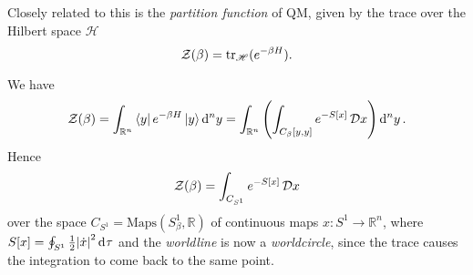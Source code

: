 \begin{definition}
  Closely related to this is the \emph{partition function} of QM, given by the trace over the Hilbert space $\mathscr{H}$
  \begin{equation}
    \mathcal{Z}(\beta) = \tr_{\mathscr{H}}(e^{-\beta H}).
  \end{equation}
\end{definition}

We have
\begin{equation}
  \mathcal{Z}(\beta) = \int_{\mathbb{R}^n} \bra{y} e^{-\beta H} \ket{y} \dd[n]{y} = \int_{\mathbb{R}^n} \left( \int_{C_{\beta} [y, y]} e^{-S[x]} \mathop{\mathcal{D} x} \right) \dd[n]{y}.
\end{equation}
Hence
\begin{equation}
  \mathcal{Z} (\beta) = \int_{C_{S^1}} e^{-S[x]} \mathop{\mathcal{D} x}
\end{equation}
over the space $C_{S^1} = \text{Maps}(S^1_{\beta}, \mathbb{R})$ of continuous maps $x \colon S^1 \to \mathbb{R}^n$, where $S[x] = \oint_{S^1} \frac{1}{2} \abs{\dot{x}}^2 \dd[]{\tau}$ and the \emph{worldline} is now a \emph{worldcircle}, since the trace causes the integration to come back to the same point.

